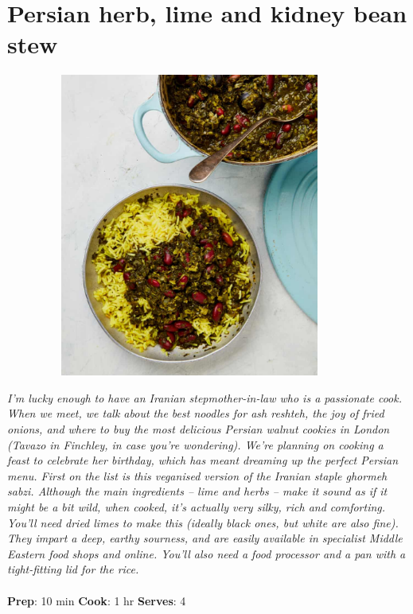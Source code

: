 \documentclass{book}
\begin{document}
\section{Persian herb, lime and kidney bean stew}
\begin{figure}
\centering\includegraphics[width=10cm,height=10cm,keepaspectratio]{Recipe_Pictures/Persian_herb,_lime_and_kidney_bean_stew.png}
\end{figure}
\emph{I’m lucky enough to have an Iranian stepmother-in-law who is a passionate cook. When we meet, we talk about the best noodles for ash reshteh, the joy of fried onions, and where to buy the most delicious Persian walnut cookies in London (Tavazo in Finchley, in case you’re wondering). We’re planning on cooking a feast to celebrate her birthday, which has meant dreaming up the perfect Persian menu. First on the list is this veganised version of the Iranian staple ghormeh sabzi. Although the main ingredients – lime and herbs – make it sound as if it might be a bit wild, when cooked, it’s actually very silky, rich and comforting.\\ 
You’ll need dried limes to make this (ideally black ones, but white are also fine). They impart a deep, earthy sourness, and are easily available in specialist Middle Eastern food shops and online. You’ll also need a food processor and a pan with a tight-fitting lid for the rice.}\\\\ 
\textbf{Prep}: 10 min
\textbf{Cook}: 1 hr
\textbf{Serves}: 4
\end{document}
